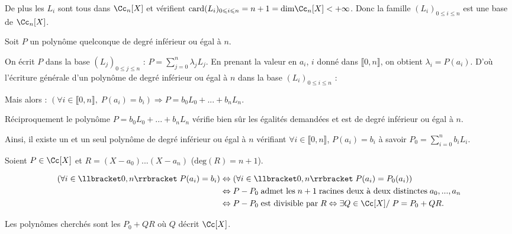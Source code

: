 {{De plus les $L_i$ sont tous dans $\Cc_n[X]$ et vérifient $\text{card}(L_i)_{0\leqslant i\leqslant n}= n+1=\text{dim}\Cc_n[X]<+\infty$. Donc la famille $(L_i)_{0\leqslant i\leqslant n}$ est une base de $\Cc_n[X]$.

Soit $P$ un polynôme quelconque de degré inférieur ou égal à $n$.

On écrit $P$ dans la base $(L_j)_{0\leqslant j\leqslant n}$ : $P=\sum_{j=0}^{n}\lambda_jL_j$. 
En prenant la valeur en $a_i$, $i$ donné dans $\llbracket0,n\rrbracket$, on obtient $\lambda_i= P(a_i)$. D'où l'écriture générale d'un polynôme de degré inférieur ou égal à $n$ dans la base $(L_i)_{0\leqslant i\leqslant n}$ : 

\begin{center}
\end{center}

Mais alors : $(\forall i\in\llbracket0,n\rrbracket,\;P(a_i)=b_i)\Rightarrow P=b_0L_0 + ... + b_nL_n$.

 
Réciproquement le polynôme $P= b_0L_0+ ... +b_nL_n$ vérifie bien sûr les égalités demandées et est de degré inférieur ou égal à $n$.

Ainsi, il existe un et un seul polynôme de degré inférieur ou égal à $n$ vérifiant $\forall i\in\llbracket0,n\rrbracket$, $P(a_i)=b_i$ à savoir $P_0=\sum_{i=0}^{n}b_iL_i$.

Soient $P\in\Cc[X]$ et $R=(X-a_0) ... (X-a_n)$ ($\text{deg}(R)=n+1$).

\begin{align*}\ensuremath
(\forall i\in\llbracket0,n\rrbracket\;P(a_i) = b_i)&\Leftrightarrow(\forall i\in\llbracket0,n\rrbracket\;P(a_i)=P_0(a_i))\\
 &\Leftrightarrow P-P_0\;\text{admet les}\;n+1\;\text{racines deux à deux distinctes}\;a_0,...,a_n\\
  &\Leftrightarrow P-P_0\;\text{est divisible par}\;R\Leftrightarrow\exists Q\in\Cc[X]/\;P= P_0+QR.
\end{align*}

Les polynômes cherchés sont les $P_0+QR$ où $Q$ décrit $\Cc[X]$.
}
}
